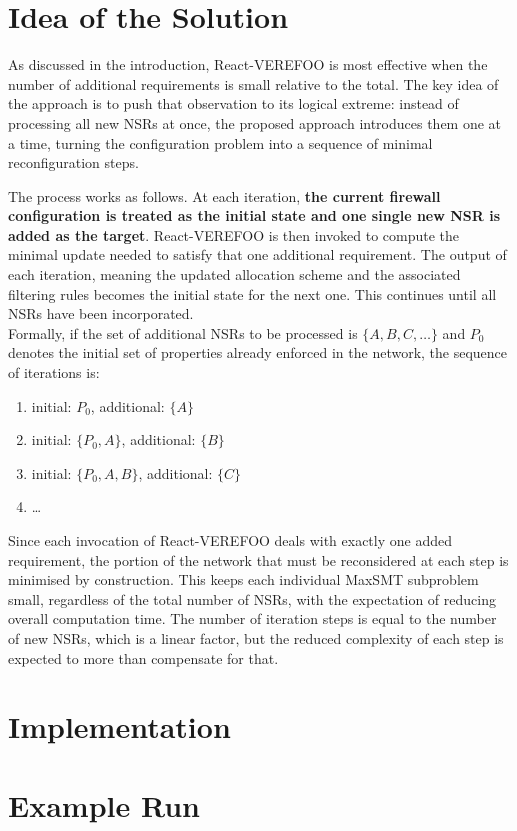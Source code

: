 
\section{Idea of the Solution}

As discussed in the introduction, React-VEREFOO is most effective when the number of additional requirements is small relative to the total. The key idea of the approach is to push that observation to its logical extreme: instead of processing all new NSRs at once, the proposed approach introduces them one at a time, turning the configuration problem into a sequence of minimal reconfiguration steps.

The process works as follows. At each iteration, \textbf{the current firewall configuration is treated as the initial state and one single new NSR is added as the target}. React-VEREFOO is then invoked to compute the minimal update needed to satisfy that one additional requirement. The output of each iteration, meaning the updated allocation scheme and the associated filtering rules becomes the initial state for the next one. This continues until all NSRs have been incorporated. 
\\Formally, if the set of additional NSRs to be processed is $\{A, B, C, \ldots\}$ and $P_0$ denotes the initial set of properties already enforced in the network, the sequence of iterations is:

\begin{enumerate}
  \item initial: $P_0$, additional: $\{A\}$
  \item initial: $\{P_0, A\}$, additional: $\{B\}$
  \item initial: $\{P_0, A, B\}$, additional: $\{C\}$
  \item \ldots
\end{enumerate}

Since each invocation of React-VEREFOO deals with exactly one added requirement, the portion of the network that must be reconsidered at each step is minimised by construction. This keeps each individual MaxSMT subproblem small, regardless of the total number of NSRs, with the expectation of reducing overall computation time. The number of iteration steps is equal to the number of new NSRs, which is a linear factor, but the reduced complexity of each step is expected to more than compensate for that.

\section{Implementation}

\section{Example Run}
